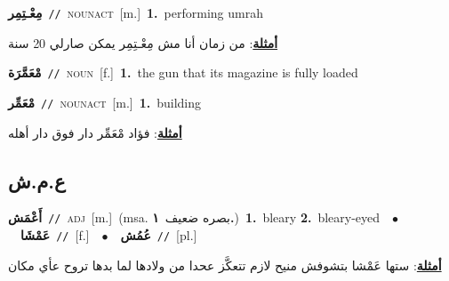 \documentclass[10pt,a4paper,twoside]{article} %
\begin{document}
\begin{multicols}{2}
{\setlength\topsep{0pt}\textbf{\foreignlanguage{arabic}{مِعْـتِمِر}}\ {\color{gray}\texttt{//}\color{black}}\ \textsc{noun\textunderscore act}\ [m.]\ \textbf{1.}~performing umrah\  \begin{flushright}\color{gray}\foreignlanguage{arabic}{\textbf{\underline{\foreignlanguage{arabic}{أمثلة}}}: من زمان أنا مش مِعْـتِمِر يمكن صارلي 20 سنة}\end{flushright}\color{black}} \vspace{2mm}

{\setlength\topsep{0pt}\textbf{\foreignlanguage{arabic}{مْعَمَّرَة}}\ {\color{gray}\texttt{//}\color{black}}\ \textsc{noun}\ [f.]\ \textbf{1.}~the gun that its magazine is fully loaded\ } \vspace{2mm}

{\setlength\topsep{0pt}\textbf{\foreignlanguage{arabic}{مْعَمِّر}}\ {\color{gray}\texttt{//}\color{black}}\ \textsc{noun\textunderscore act}\ [m.]\ \textbf{1.}~building\  \begin{flushright}\color{gray}\foreignlanguage{arabic}{\textbf{\underline{\foreignlanguage{arabic}{أمثلة}}}: فؤاد مْعَمِّر دار فوق دار أهله}\end{flushright}\color{black}} \vspace{2mm}

\vspace{-3mm}
\subsection*{\color{blue}\foreignlanguage{arabic}{ع.م.ش}\color{blue}{}} 

{\setlength\topsep{0pt}\textbf{\foreignlanguage{arabic}{أَعْمَش}}\ {\color{gray}\texttt{//}\color{black}}\ \textsc{adj}\ [m.]\ \color{gray}(msa. \foreignlanguage{arabic}{بصره ضعيف}~\foreignlanguage{arabic}{\textbf{١.}})\color{black}\ \textbf{1.}~bleary  \textbf{2.}~bleary-eyed\ \ $\bullet$\ \ \setlength\topsep{0pt}\textbf{\foreignlanguage{arabic}{عَمْشَا}}\ {\color{gray}\texttt{//}\color{black}}\ [f.]\ \ $\bullet$\ \ \setlength\topsep{0pt}\textbf{\foreignlanguage{arabic}{عُمُش}}\ {\color{gray}\texttt{//}\color{black}}\ [pl.]\  \begin{flushright}\color{gray}\foreignlanguage{arabic}{\textbf{\underline{\foreignlanguage{arabic}{أمثلة}}}: ستها عَمْشا بتشوفش منيح لازم تتعكَّز عحدا من ولادها لما بدها تروح عأي مكان}\end{flushright}\color{black}} \vspace{2mm}


\end{multicols}
\end{document}
